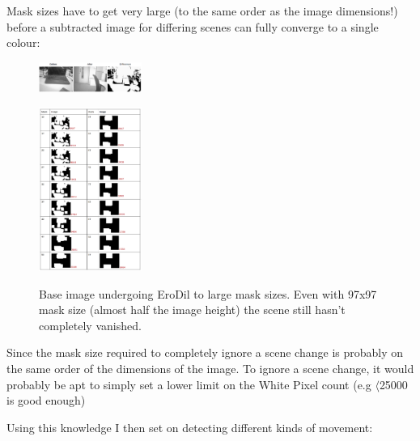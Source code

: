 \documentclass[11pt]{article} %
\begin{document}
Mask sizes have to get very large (to the same order as the image dimensions!) before a subtracted image for differing scenes can  fully converge to a single colour:
\begin{figure}
	\vspace{-20pt}
	\begin{center}
		\includegraphics[width=0.3\textwidth]{../images/ImageOps/Diff1}
		\label{img:diff1}
	\end{center}
	\vspace{-20pt}
	\begin{center}
		\includegraphics[width=0.3\textwidth]{../images/ImageOps/Diff2}
		\label{img:diff2}
	\end{center}
	\vspace{-20pt}
	\caption{Base image undergoing EroDil to large mask sizes. Even with 97x97 mask size (almost half the image height) the scene still hasn't completely vanished.}
\end{figure}
Since the mask size required to completely ignore a scene change is probably on the same order of the dimensions of the image.  To ignore a scene change, it would probably be apt to simply set a lower limit on the White Pixel count (e.g \(\langle\)25000 is good enough)

Using this knowledge I then set on detecting different kinds of movement:
\end{document}
